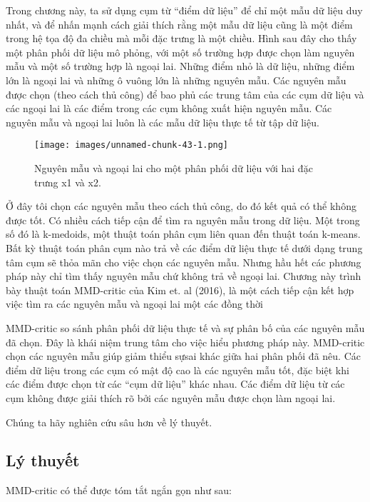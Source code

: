 Trong chương này, ta sử dụng cụm từ ``điểm dữ liệu'' để chỉ một mẫu dữ liệu duy nhất, và để nhấn mạnh cách giải thích rằng một mẫu dữ liệu cũng là một điểm trong hệ tọa độ đa chiều mà mỗi đặc trưng là một chiều. Hình sau đây cho thấy một phân phối dữ liệu mô phỏng, với một số trường hợp được chọn làm nguyên mẫu và một số trường hợp là ngoại lai. Những điểm nhỏ là dữ liệu, những điểm lớn là ngoại lai và những ô vuông lớn là những nguyên mẫu. Các nguyên mẫu được chọn (theo cách thủ công) để bao phủ các trung tâm của các cụm dữ liệu và các ngoại lai là các điểm trong các cụm không xuất hiện nguyên mẫu. Các nguyên mẫu và ngoại lai luôn là các mẫu dữ liệu thực tế từ tập dữ liệu.


\begin{figure*}[h!]
	\centering
	\texttt{[image: images/unnamed-chunk-43-1.png]}
	\label{fig:6_7}
	\caption{Nguyên mẫu và ngoại lai cho một phân phối dữ liệu với hai đặc trưng x1 và x2.}
\end{figure*}

Ở đây tôi chọn các nguyên mẫu theo cách thủ công, do đó kết quả có thể không được tốt. Có nhiều cách tiếp cận để tìm ra nguyên mẫu trong dữ liệu. Một trong số đó là k-medoids, một thuật toán phân cụm liên quan đến thuật toán k-means. Bất kỳ thuật toán phân cụm nào trả về các điểm dữ liệu thực tế dưới dạng trung tâm cụm sẽ thỏa mãn cho việc chọn các nguyên mẫu. Nhưng hầu hết các phương pháp này chỉ tìm thấy nguyên mẫu chứ không trả về ngoại lai. Chương này trình bày thuật toán MMD-critic của Kim et. al (2016), là một cách tiếp cận kết hợp việc tìm ra các nguyên mẫu và ngoại lai một các đồng thời

MMD-critic so sánh phân phối dữ liệu thực tế và sự phân bố của các nguyên mẫu đã chọn. Đây là khái niệm trung tâm cho việc hiểu phương pháp này. MMD-critic chọn các nguyên mẫu giúp giảm thiểu sựsai khác giữa hai phân phối đã nêu. Các điểm dữ liệu trong các cụm có mật độ cao là các nguyên mẫu tốt, đặc biệt khi các điểm được chọn từ các ``cụm dữ liệu'' khác nhau. Các điểm dữ liệu từ các cụm không được giải thích rõ bởi các nguyên mẫu được chọn làm ngoại lai.

Chúng ta hãy nghiên cứu sâu hơn về lý thuyết.

\subsection{Lý thuyết}

MMD-critic có thể được tóm tắt ngắn gọn như sau:

